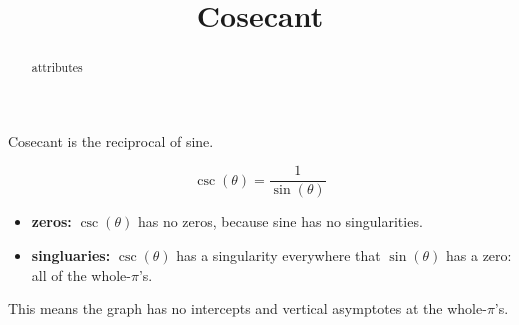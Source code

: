 \documentclass{ximera}
\title{Cosecant}
\begin{document}
\begin{abstract}
attributes
\end{abstract}
\maketitle




Cosecant is the reciprocal of sine. 

\[   \csc(\theta)  =  \frac{1}{\sin(\theta)}  \]



\begin{itemize}
\item \textbf{zeros:} $\csc(\theta)$ has no zeros, because sine has no singularities.
\item \textbf{singluaries:} $\csc(\theta)$ has a singularity everywhere that $\sin(\theta)$ has a zero:  all of the whole-$\pi$'s.
\end{itemize}

This means the graph has no intercepts and vertical asymptotes at the whole-$\pi$'s.
\end{document}
